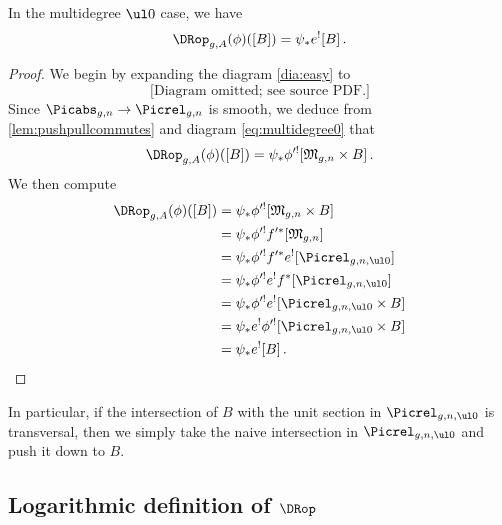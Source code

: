 \begin{lemma}
\notready In the multidegree $\ul 0$ case, we have
\begin{equation}
    \DRop_{g,A}(\phi)([B]) = \psi_*e^![B]\, .
\end{equation}
\end{lemma}
\begin{proof}
We begin by expanding the diagram \cref{dia:easy} to
\begin{equation}
    \text{[Diagram omitted; see source PDF.]}
\end{equation}
Since $\Picabs_{g,n} \to \Picrel_{g,n}$ is smooth, we deduce from \cref{lem:pushpullcommutes} and  diagram \cref{eq:multidegree0} that
\begin{equation}
    \DRop_{g,A}(\phi)([B]) = \psi_*\phi'^![\frak M_{g,n} \times B]\, .
\end{equation}
We then compute
\begin{equation}
    \begin{split}
        \DRop_{g,A}(\phi)([B]) & = \psi_*\phi'^![\frak M_{g,n} \times B]\\
        & = \psi_*\phi'^! f'^*[\frak M_{g,n}]\\
        & = \psi_*\phi'^! f'^*e^![\Picrel_{g,n,\ul 0}]\\
        & = \psi_*\phi'^! e^! f^*[\Picrel_{g,n,\ul 0}]\\
        & = \psi_*\phi'^! e^! [\Picrel_{g,n,\ul 0}\times B]\\
        & = \psi_*e^! \phi'^!  [\Picrel_{g,n,\ul 0}\times B]\\
        & = \psi_*e^! [B]\, . \\
    \end{split}
\end{equation}
\end{proof}
In particular, if the intersection of $B$ with the unit section in $\Picrel_{g,n,\ul 0}$ is transversal, then we simply take the naive intersection in $\Picrel_{g,n,\ul 0}$ and push it down to $B$.


\subsection{Logarithmic definition of \texorpdfstring{$\DRop$}{DR\^{}op}}\label{sec:log_def}


